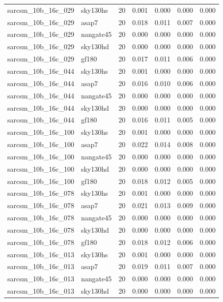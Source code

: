 \begin{tabular}{llrrrrr}
sarcsm\_10b\_16c\_029 & sky130hs & 20 & 0.001 & 0.000 & 0.000 & 0.000 \\
sarcsm\_10b\_16c\_029 & asap7 & 20 & 0.018 & 0.011 & 0.007 & 0.000 \\
sarcsm\_10b\_16c\_029 & nangate45 & 20 & 0.000 & 0.000 & 0.000 & 0.000 \\
sarcsm\_10b\_16c\_029 & sky130hd & 20 & 0.000 & 0.000 & 0.000 & 0.000 \\
sarcsm\_10b\_16c\_029 & gf180 & 20 & 0.017 & 0.011 & 0.006 & 0.000 \\
sarcsm\_10b\_16c\_044 & sky130hs & 20 & 0.001 & 0.000 & 0.000 & 0.000 \\
sarcsm\_10b\_16c\_044 & asap7 & 20 & 0.016 & 0.010 & 0.006 & 0.000 \\
sarcsm\_10b\_16c\_044 & nangate45 & 20 & 0.000 & 0.000 & 0.000 & 0.000 \\
sarcsm\_10b\_16c\_044 & sky130hd & 20 & 0.000 & 0.000 & 0.000 & 0.000 \\
sarcsm\_10b\_16c\_044 & gf180 & 20 & 0.016 & 0.011 & 0.005 & 0.000 \\
sarcsm\_10b\_16c\_100 & sky130hs & 20 & 0.001 & 0.000 & 0.000 & 0.000 \\
sarcsm\_10b\_16c\_100 & asap7 & 20 & 0.022 & 0.014 & 0.008 & 0.000 \\
sarcsm\_10b\_16c\_100 & nangate45 & 20 & 0.000 & 0.000 & 0.000 & 0.000 \\
sarcsm\_10b\_16c\_100 & sky130hd & 20 & 0.000 & 0.000 & 0.000 & 0.000 \\
sarcsm\_10b\_16c\_100 & gf180 & 20 & 0.018 & 0.012 & 0.005 & 0.000 \\
sarcsm\_10b\_16c\_078 & sky130hs & 20 & 0.001 & 0.000 & 0.000 & 0.000 \\
sarcsm\_10b\_16c\_078 & asap7 & 20 & 0.021 & 0.013 & 0.009 & 0.000 \\
sarcsm\_10b\_16c\_078 & nangate45 & 20 & 0.000 & 0.000 & 0.000 & 0.000 \\
sarcsm\_10b\_16c\_078 & sky130hd & 20 & 0.000 & 0.000 & 0.000 & 0.000 \\
sarcsm\_10b\_16c\_078 & gf180 & 20 & 0.018 & 0.012 & 0.006 & 0.000 \\
sarcsm\_10b\_16c\_013 & sky130hs & 20 & 0.001 & 0.000 & 0.000 & 0.000 \\
sarcsm\_10b\_16c\_013 & asap7 & 20 & 0.019 & 0.011 & 0.007 & 0.000 \\
sarcsm\_10b\_16c\_013 & nangate45 & 20 & 0.000 & 0.000 & 0.000 & 0.000 \\
sarcsm\_10b\_16c\_013 & sky130hd & 20 & 0.000 & 0.000 & 0.000 & 0.000 \\

\end{tabular}
